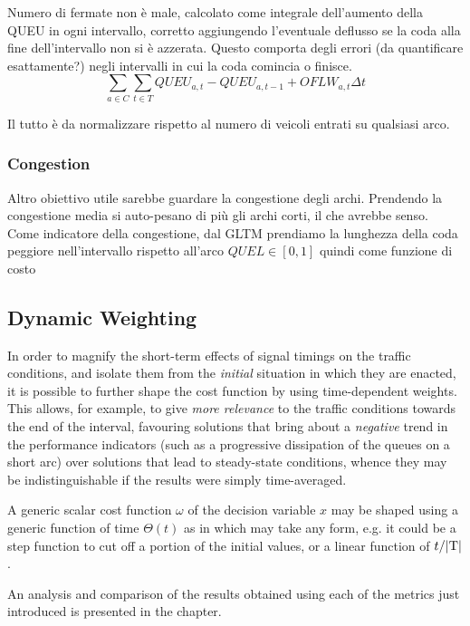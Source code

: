 Numero di fermate non è male, calcolato come integrale dell'aumento della QUEU in ogni intervallo, corretto aggiungendo l'eventuale deflusso se la coda alla fine dell'intervallo non si è azzerata.
Questo comporta degli errori (da quantificare esattamente?) negli intervalli in cui la coda comincia o finisce.
$$
\sum_{a \in C} \sum_{t \in T} QUEU_{a,t} - QUEU_{a,t-1} + OFLW_{a,t} \Delta t
$$

Il tutto è da normalizzare rispetto al numero di veicoli entrati su qualsiasi arco.


\subsubsection{Congestion}

Altro obiettivo utile sarebbe guardare la congestione degli archi.
Prendendo la congestione media si auto-pesano di più gli archi corti, il che avrebbe senso.
Come indicatore della congestione, dal GLTM prendiamo la lunghezza della coda peggiore nell'intervallo rispetto all'arco $QUEL\in[0,1]$ quindi come funzione di costo


\subsection{Dynamic Weighting}
In order to magnify the short-term effects of signal timings on the traffic conditions, and isolate them from the \emph{initial} situation in which they are enacted, it is possible to further shape the cost function by using time-dependent weights. This allows, for example, to give \emph{more relevance} to the traffic conditions towards the end of the interval, favouring solutions that bring about a \emph{negative} trend in the performance indicators (such as a progressive dissipation of the queues on a short arc) over solutions that lead to steady-state conditions, whence they may be indistinguishable if the results were simply time-averaged.

A generic scalar cost function $\omega$ of the decision variable $x$
may be shaped using a generic function of time $\Theta(t)$ as in
which may take any form, e.g. it could be a step function to cut off a portion of the initial values, or a linear function of ${t}/{|\mathrm{T}|}$.

An analysis and comparison of the results obtained using each of the metrics just introduced is presented in the  chapter.